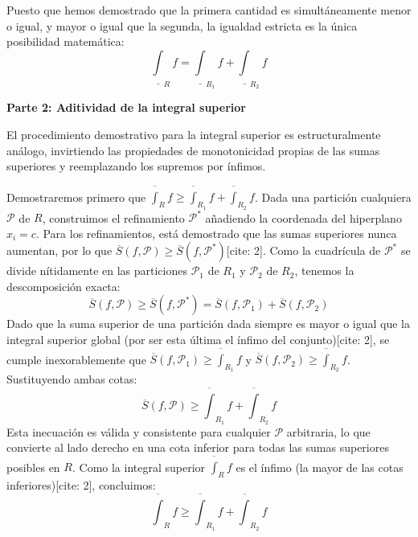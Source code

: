 \documentclass[11pt,letterpaper]{article}
\begin{document}
Puesto que hemos demostrado que la primera cantidad es simultáneamente menor o igual, y mayor o igual que la segunda, la igualdad estricta es la única posibilidad matemática:
\begin{equation*}
\underline{\int}_{R}f = \underline{\int}_{R_{1}}f + \underline{\int}_{R_{2}}f
\end{equation*}

\vspace{0.5cm}
\textbf{Parte 2: Aditividad de la integral superior}

El procedimiento demostrativo para la integral superior es estructuralmente análogo, invirtiendo las propiedades de monotonicidad propias de las sumas superiores y reemplazando los supremos por ínfimos.

Demostraremos primero que $\overline{\int}_{R}f \ge \overline{\int}_{R_{1}}f + \overline{\int}_{R_{2}}f$.
Dada una partición cualquiera $\mathcal{P}$ de $R$, construimos el refinamiento $\mathcal{P}^{*}$ añadiendo la coordenada del hiperplano $x_{i}=c$. Para los refinamientos, está demostrado que las sumas superiores nunca aumentan, por lo que $\overline{S}(f, \mathcal{P}) \ge \overline{S}(f, \mathcal{P}^{*})$[cite: 2].
Como la cuadrícula de $\mathcal{P}^{*}$ se divide nítidamente en las particiones $\mathcal{P}_{1}$ de $R_{1}$ y $\mathcal{P}_{2}$ de $R_{2}$, tenemos la descomposición exacta:
\begin{equation*}
\overline{S}(f, \mathcal{P}) \ge \overline{S}(f, \mathcal{P}^{*}) = \overline{S}(f, \mathcal{P}_{1}) + \overline{S}(f, \mathcal{P}_{2})
\end{equation*}
Dado que la suma superior de una partición dada siempre es mayor o igual que la integral superior global (por ser esta última el ínfimo del conjunto)[cite: 2], se cumple inexorablemente que $\overline{S}(f, \mathcal{P}_{1}) \ge \overline{\int}_{R_{1}}f$ y $\overline{S}(f, \mathcal{P}_{2}) \ge \overline{\int}_{R_{2}}f$. Sustituyendo ambas cotas:
\begin{equation*}
\overline{S}(f, \mathcal{P}) \ge \overline{\int}_{R_{1}}f + \overline{\int}_{R_{2}}f
\end{equation*}
Esta inecuación es válida y consistente para cualquier $\mathcal{P}$ arbitraria, lo que convierte al lado derecho en una cota inferior para todas las sumas superiores posibles en $R$. Como la integral superior $\overline{\int}_{R}f$ es el ínfimo (la mayor de las cotas inferiores)[cite: 2], concluimos:
\begin{equation*}
\overline{\int}_{R}f \ge \overline{\int}_{R_{1}}f + \overline{\int}_{R_{2}}f
\end{equation*}
\end{document}
